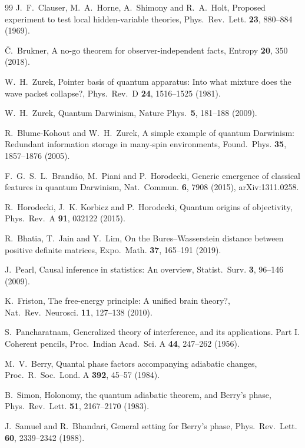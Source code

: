 \documentclass[aps,pra,onecolumn,superscriptaddress,nofootinbib,10pt]{revtex4-2}
\theoremstyle{definition}
\theoremstyle{remark}
\begin{document}
\begin{thebibliography}{99}
 J.~F.~Clauser, M.~A.~Horne, A.~Shimony and R.~A.~Holt, Proposed experiment to test local hidden-variable theories, Phys.\ Rev.\ Lett. \textbf{23}, 880--884 (1969).

 \v{C}.~Brukner, A no-go theorem for observer-independent facts, Entropy \textbf{20}, 350 (2018).

 W.~H.~Zurek, Pointer basis of quantum apparatus: Into what mixture does the wave packet collapse?, Phys.\ Rev.\ D \textbf{24}, 1516--1525 (1981).

 W.~H.~Zurek, Quantum Darwinism, Nature Phys.\ \textbf{5}, 181--188 (2009).

 R.~Blume-Kohout and W.~H.~Zurek, A simple example of quantum Darwinism: Redundant information storage in many-spin environments, Found.\ Phys. \textbf{35}, 1857--1876 (2005).

 F.~G.~S.~L.~Brand\~ao, M.~Piani and P.~Horodecki, Generic emergence of classical features in quantum Darwinism, Nat.\ Commun. \textbf{6}, 7908 (2015), arXiv:1311.0258.

 R.~Horodecki, J.~K. Korbicz and P.~Horodecki, Quantum origins of objectivity, Phys.\ Rev.\ A \textbf{91}, 032122 (2015).

 R.~Bhatia, T.~Jain and Y.~Lim, On the Bures--Wasserstein distance between positive definite matrices, Expo.\ Math. \textbf{37}, 165--191 (2019).

 J.~Pearl, Causal inference in statistics: An overview, Statist.\ Surv. \textbf{3}, 96--146 (2009).

 K.~Friston, The free-energy principle: A unified brain theory?, Nat.\ Rev.\ Neurosci. \textbf{11}, 127--138 (2010).

 S.~Pancharatnam, Generalized theory of interference, and its applications. Part I. Coherent pencils, Proc.\ Indian Acad.\ Sci. A \textbf{44}, 247--262 (1956).

 M.~V.~Berry, Quantal phase factors accompanying adiabatic changes, Proc.\ R.\ Soc.\ Lond. A \textbf{392}, 45--57 (1984).

 B.~Simon, Holonomy, the quantum adiabatic theorem, and Berry's phase, Phys.\ Rev.\ Lett. \textbf{51}, 2167--2170 (1983).

 J.~Samuel and R.~Bhandari, General setting for Berry's phase, Phys.\ Rev.\ Lett. \textbf{60}, 2339--2342 (1988).


\end{thebibliography}
\end{document}
